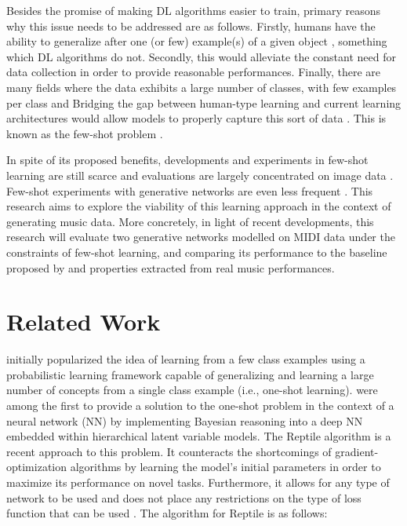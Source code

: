 Besides the promise of making DL algorithms easier to train, primary reasons why this issue needs to be addressed are as follows. Firstly, humans have the ability to generalize after one (or few) example(s) of a given object \parencite{vinyals_matching_2016, chen_closer_2018, ravi_optimization_2016}, something which DL algorithms do not. Secondly, this would alleviate the constant need for data collection in order to provide reasonable performances. Finally, there are many fields where the data exhibits a large number of classes, with few examples per class and Bridging the gap between human-type learning and current learning architectures would allow models to properly capture this sort of data \parencite{ravi_optimization_2016, larochelle_few-shot_2017}. This is known as the few-shot problem \parencite{chen_closer_2018, vinyals_matching_2016, larochelle_few-shot_2017}.

In spite of its proposed benefits, developments and experiments in few-shot learning are still scarce \parencite{larochelle_few-shot_2017} and evaluations are largely concentrated on image data \parencite[see][]{lake_omniglot_2019, clouatre_figr_2019, vinyals_matching_2016, chen_closer_2018, ravi_optimization_2016}. Few-shot experiments with generative networks are even less frequent \parencite{zhang_metagan_2018, clouatre_figr_2019}. This research aims to explore the viability of this learning approach in the context of generating music data. More concretely, in light of recent developments, this research will evaluate two generative networks modelled on MIDI data under the constraints of few-shot learning, and comparing its performance to the baseline proposed by \textcite{larochelle_few-shot_2017} and properties extracted from real music performances.

\chapter{Related Work}

\textcite{lake_human-level_2015} initially popularized the idea of learning from a few class examples using a probabilistic learning framework capable of generalizing and learning a large number of concepts from a single class example (i.e., one-shot learning). \textcite{rezende_one-shot_2016} were among the first to provide a solution to the one-shot problem in the context of a neural network (NN) by implementing Bayesian reasoning into a deep NN embedded within hierarchical latent variable models. The Reptile algorithm \parencite{nichol_first-order_2018} is a recent approach to this problem. It counteracts the shortcomings of gradient-optimization algorithms by learning the model's initial parameters in order to maximize its performance on novel tasks. Furthermore, it allows for any type of network to be used and does not place any restrictions on the type of loss function that can be used \parencite{nichol_first-order_2018}. The algorithm for Reptile is as follows:

